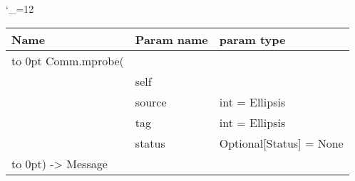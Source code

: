 \begingroup \catcode`\_=12 \tt
\begin{tabular}{lll}
\toprule
\textrm{Name}&\textrm{Param name}&\textrm{param type}\\
\midrule
\hbox to 0pt {Comm.mprobe(\hss}\\
& self\\
& source & int = Ellipsis\\
& tag & int = Ellipsis\\
& status & Optional[Status] = None\\
\hbox to 0pt{) -> Message\hss}\\
\bottomrule
\end{tabular}
\endgroup
